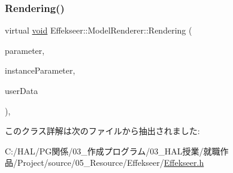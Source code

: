 \subsubsection{\texorpdfstring{Rendering()}{Rendering()}}
{\footnotesize\ttfamily virtual \mbox{\hyperlink{namespace_effekseer_ab34c4088e512200cf4c2716f168deb56}{void}} Effekseer\+::\+Model\+Renderer\+::\+Rendering (\begin{DoxyParamCaption}\item[{const \mbox{\hyperlink{struct_effekseer_1_1_model_renderer_1_1_node_parameter}{Node\+Parameter}} \&}]{parameter,  }\item[{const \mbox{\hyperlink{struct_effekseer_1_1_model_renderer_1_1_instance_parameter}{Instance\+Parameter}} \&}]{instance\+Parameter,  }\item[{\mbox{\hyperlink{namespace_effekseer_ab34c4088e512200cf4c2716f168deb56}{void}} $\ast$}]{user\+Data }\end{DoxyParamCaption})\hspace{0.3cm}{\ttfamily [inline]}, {\ttfamily [virtual]}}



このクラス詳解は次のファイルから抽出されました\+:\begin{DoxyCompactItemize}
\item 
C\+:/\+H\+A\+L/\+P\+G関係/03\+\_\+作成プログラム/03\+\_\+\+H\+A\+L授業/就職作品/\+Project/source/05\+\_\+\+Resource/\+Effekseer/\mbox{\hyperlink{_effekseer_8h}{Effekseer.\+h}}\end{DoxyCompactItemize}
